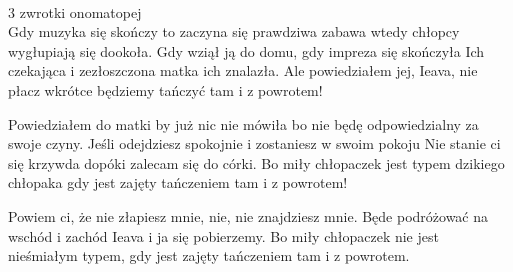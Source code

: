 \\ 3 zwrotki onomatopej \\

Gdy muzyka się skończy to zaczyna się prawdziwa zabawa
wtedy chłopcy wygłupiają się dookoła.
Gdy wziął ją do domu, gdy impreza się skończyła
Ich czekająca i zezłoszczona matka ich znalazła.
Ale powiedziałem jej, Ieava, nie płacz
wkrótce będziemy tańczyć tam i z powrotem!

Powiedziałem do matki by już nic nie mówiła
bo nie będę odpowiedzialny za swoje czyny.
Jeśli odejdziesz spokojnie i zostaniesz w swoim pokoju
Nie stanie ci się krzywda dopóki zalecam się do córki.
Bo miły chłopaczek jest typem dzikiego chłopaka
gdy jest zajęty tańczeniem tam i z powrotem!

Powiem ci, że nie złapiesz mnie,
nie, nie znajdziesz mnie.
Będe podróżować na wschód i zachód
Ieava i ja się pobierzemy.
Bo miły chłopaczek nie jest nieśmiałym typem,
gdy jest zajęty tańczeniem tam i z powrotem. 